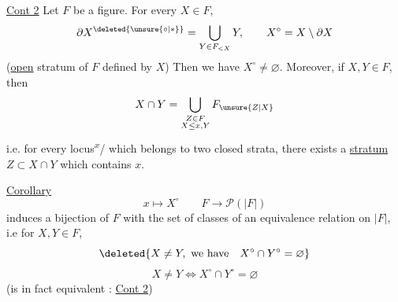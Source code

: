 \uline{Cont 2} \quad Let $F$ be a figure.  For every $X\in F$,  
\[
\partial X^{\deleted{\unsure{\circ|*}}}=\bigcup_{Y\in F_{<X}}Y,\qquad X^\circ=X\setminus\partial X
\]
(\uline{open} stratum of $F$ defined by $X$) Then we have $\boxed{X^\circ\ne\varnothing}$. Moreover, if $X,Y\in F$, then
\[
X\cap Y=\bigcup_{\substack{Z\in F\\X\leq x,Y}}F_{\unsure{Z|X}}
\]
i.e.  for every  locus\textsuperscript{$x$}/ which belongs to two closed strata,  there exists a \uline{stratum} $Z\subset X\cap Y$   which contains $x$.

\uline{Corollary}  
\[
x\longmapsto X^\circ\qquad F\longrightarrow \mathcal{P}(|F|)
\]
induces a bijection of $F$ with the set of classes of an equivalence relation on $|F|$, i.e for $X,Y\in F$,  
\[
\deleted{X\ne Y,\ \text{we have}\quad X^\circ\cap Y^\circ=\varnothing}
\]
\[
X\ne Y\iff X^\circ\cap Y^\circ=\varnothing
\]
(is in fact equivalent : \uline{Cont 2})

 

